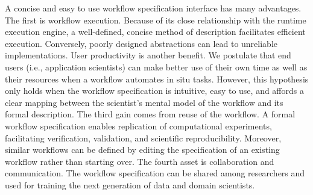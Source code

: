 \begin{refsection}
A concise and easy to use workflow specification interface has many advantages. The first is workflow execution. Because of its close relationship with the runtime execution engine, a well-defined, concise method of description facilitates efficient execution. Conversely, poorly designed abstractions can lead to unreliable implementations. User productivity is another benefit. We postulate that end users (i.e., application scientists) can make better use of their own time as well as their resources when a workflow automates in situ tasks. However, this hypothesis only holds when the workflow specification is intuitive, easy to use, and affords a clear mapping between the scientist’s mental model of the workflow and its formal description. The third gain comes from reuse of the workflow. A formal workflow specification enables replication of computational experiments, facilitating verification, validation, and scientific reproducibility. Moreover, similar workflows can be defined by editing the specification of an existing workflow rather than starting over. The fourth asset is collaboration and communication. The workflow specification can be shared among researchers and used for training the next generation of data and domain scientists.

\printbibliography
\end{refsection}

